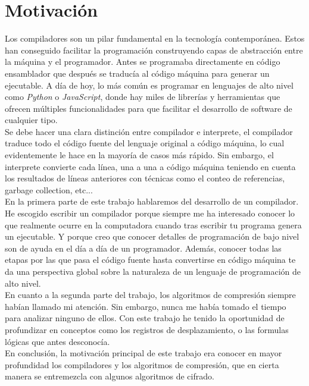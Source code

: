 \section{Motivación}
Los compiladores son un pilar fundamental en la tecnología contemporánea. Estos han conseguido facilitar la programación construyendo capas de abstracción entre la máquina y el programador. Antes se programaba directamente en código ensamblador que después se traducía al código máquina para generar un ejecutable. A día de hoy, lo más común es programar en lenguajes de alto nivel como \textit{Python} o \textit{JavaScript}, donde hay miles de librerías y herramientas que ofrecen múltiples funcionalidades para que facilitar el desarrollo de software de cualquier tipo. \\
Se debe hacer una clara distinción entre compilador e interprete, el compilador traduce todo el código fuente del lenguaje original a código máquina, lo cual evidentemente le hace en la mayoría de casos más rápido. Sin embargo, el interprete convierte cada línea, una a una a código máquina teniendo en cuenta los resultados de líneas anteriores con técnicas como el conteo de referencias, garbage collection, etc... \\
En la primera parte de este trabajo hablaremos del desarrollo de un compilador. He escogido escribir un compilador porque siempre me ha interesado conocer lo que realmente ocurre en la computadora cuando tras escribir tu programa genera un ejecutable. Y porque creo que conocer detalles de programación de bajo nivel son de ayuda en el día a día de un programador. Además, conocer todas las etapas por las que pasa el código fuente hasta convertirse en código máquina te da una perspectiva global sobre la naturaleza de un lenguaje de programación de alto nivel.\\
En cuanto a la segunda parte del trabajo, los algoritmos de compresión siempre habían llamado mi atención. Sin embargo, nunca me había tomado el tiempo para analizar ninguno de ellos. Con este trabajo he tenido la oportunidad de profundizar en conceptos como los registros de desplazamiento, o las formulas lógicas que antes desconocía.\\
En conclusión, la motivación principal de este trabajo era conocer en mayor profundidad los compiladores y los algoritmos de compresión, que en cierta manera se entremezcla con algunos algoritmos de cifrado.


